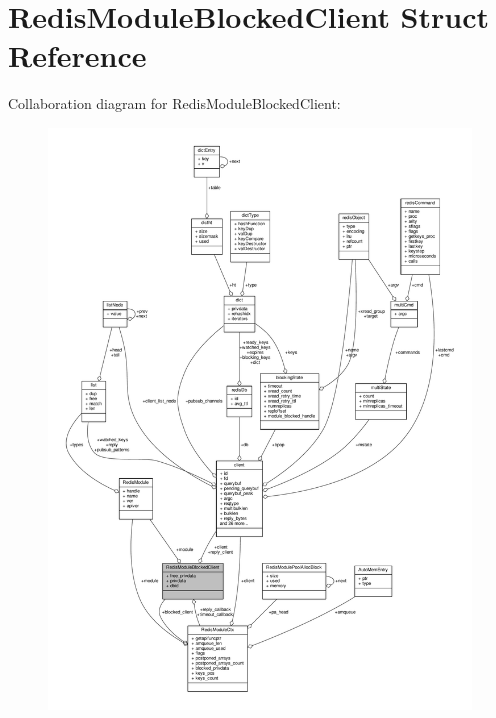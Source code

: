 \hypertarget{structRedisModuleBlockedClient}{}\section{Redis\+Module\+Blocked\+Client Struct Reference}
\label{structRedisModuleBlockedClient}


Collaboration diagram for Redis\+Module\+Blocked\+Client\+:\nopagebreak
\begin{figure}[H]
\begin{center}
\leavevmode
\includegraphics[width=350pt]{structRedisModuleBlockedClient__coll__graph}
\end{center}
\end{figure}

